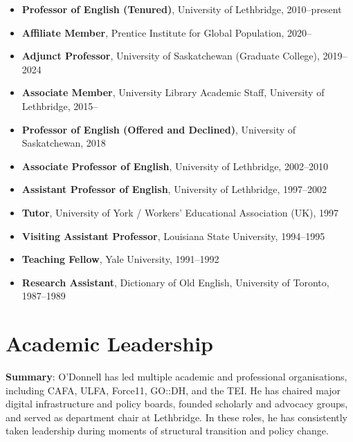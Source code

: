 \documentclass[12pt]{article}
\begin{document}
\begin{itemize}
  \item \textbf{Professor of English (Tenured)}, University of Lethbridge, 2010–present
  \item \textbf{Affiliate Member}, Prentice Institute for Global Population, 2020–
  \item \textbf{Adjunct Professor}, University of Saskatchewan (Graduate College), 2019–2024
  \item \textbf{Associate Member}, University Library Academic Staff, University of Lethbridge, 2015–
  \item \textbf{Professor of English (Offered and Declined)}, University of Saskatchewan, 2018
  \item \textbf{Associate Professor of English}, University of Lethbridge, 2002–2010
  \item \textbf{Assistant Professor of English}, University of Lethbridge, 1997–2002
  \item \textbf{Tutor}, University of York / Workers’ Educational Association (UK), 1997
  \item \textbf{Visiting Assistant Professor}, Louisiana State University, 1994–1995
  \item \textbf{Teaching Fellow}, Yale University, 1991–1992
  \item \textbf{Research Assistant}, Dictionary of Old English, University of Toronto, 1987–1989
\end{itemize}


\section*{Academic Leadership}

\textbf{Summary}: O'Donnell has led multiple academic and professional organisations, including CAFA, ULFA, Force11, GO::DH, and the TEI. He has chaired major digital infrastructure and policy boards, founded scholarly and advocacy groups, and served as department chair at Lethbridge. In these roles, he has consistently taken leadership during moments of structural transition and policy change.
\end{document}
